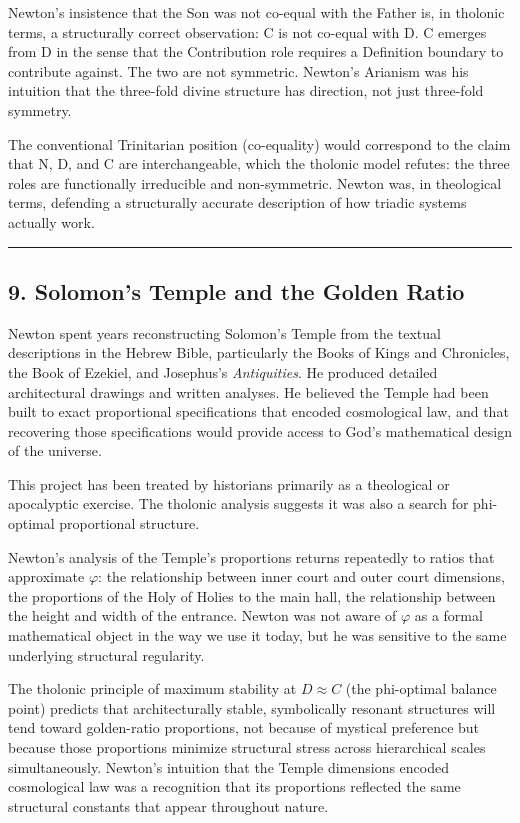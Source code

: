 \documentclass[
  11pt,
  letterpaper,
]{article}
\begin{document}
Newton's insistence that the Son was not co-equal with the Father is, in
tholonic terms, a structurally correct observation: C is not co-equal
with D. C emerges from D in the sense that the Contribution role
requires a Definition boundary to contribute against. The two are not
symmetric. Newton's Arianism was his intuition that the three-fold
divine structure has direction, not just three-fold symmetry.

The conventional Trinitarian position (co-equality) would correspond to
the claim that N, D, and C are interchangeable, which the tholonic model
refutes: the three roles are functionally irreducible and non-symmetric.
Newton was, in theological terms, defending a structurally accurate
description of how triadic systems actually work.

\begin{center}\rule{0.5\linewidth}{0.5pt}\end{center}

\subsection{9. Solomon's Temple and the Golden
Ratio}\label{solomons-temple-and-the-golden-ratio}

Newton spent years reconstructing Solomon's Temple from the textual
descriptions in the Hebrew Bible, particularly the Books of Kings and
Chronicles, the Book of Ezekiel, and Josephus's \emph{Antiquities}. He
produced detailed architectural drawings and written analyses. He
believed the Temple had been built to exact proportional specifications
that encoded cosmological law, and that recovering those specifications
would provide access to God's mathematical design of the universe.

This project has been treated by historians primarily as a theological
or apocalyptic exercise. The tholonic analysis suggests it was also a
search for phi-optimal proportional structure.

Newton's analysis of the Temple's proportions returns repeatedly to
ratios that approximate \(\varphi\): the relationship between inner
court and outer court dimensions, the proportions of the Holy of Holies
to the main hall, the relationship between the height and width of the
entrance. Newton was not aware of \(\varphi\) as a formal mathematical
object in the way we use it today, but he was sensitive to the same
underlying structural regularity.

The tholonic principle of maximum stability at \(D \approx C\) (the
phi-optimal balance point) predicts that architecturally stable,
symbolically resonant structures will tend toward golden-ratio
proportions, not because of mystical preference but because those
proportions minimize structural stress across hierarchical scales
simultaneously. Newton's intuition that the Temple dimensions encoded
cosmological law was a recognition that its proportions reflected the
same structural constants that appear throughout nature.
\end{document}
